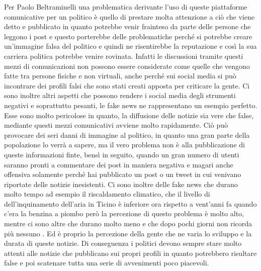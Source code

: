 Per Paolo Beltraminelli una problematica derivante l’uso di queste piattaforme comunicative per un politico è quello di prestare molta attenzione a ciò che viene detto e pubblicato in quanto potrebbe venir frainteso da parte delle persone che leggono i post e questo porterebbe delle problematiche perché si potrebbe creare un’immagine falsa del politico e quindi ne risentirebbe la reputazione e così la sua carriera politica potrebbe venire rovinata. Infatti le discussioni tramite questi mezzi di comunicazioni non possono essere considerate come quelle che vengono fatte tra persone fisiche e non virtuali, anche perché sui social media si può incontrare dei profili falsi che sono stati creati apposta per criticare la gente. Ci sono inoltre altri aspetti che possono rendere i social media degli strumenti negativi e soprattutto pesanti, le fake news ne rappresentano un esempio perfetto. Esse sono molto pericolose in quanto, la diffusione delle notizie sia vere che false, mediante questi mezzi comunicativi avviene molto rapidamente. Ciò può provocare dei seri danni di immagine al politico, in quanto una gran parte della popolazione lo verrà a sapere, ma il vero problema non è alla pubblicazione di queste informazioni finte, bensì in seguito, quando un gran numero di utenti saranno pronti a commentare dei post in maniera negativa e magari anche offensiva solamente perché hai pubblicato un post o un tweet in cui venivano riportate delle notizie inesistenti. Ci sono inoltre delle fake news che durano molto tempo ad esempio il riscaldamento climatico, che il livello di dell’inquinamento dell’aria in Ticino è inferiore ora rispetto a vent’anni fa quando c’era la benzina a piombo però la percezione di questo problema è molto alto, mentre ci sono altre che durano molto meno e che dopo pochi giorni non ricorda più nessuno . Ed è proprio la percezione della gente che ne varia lo sviluppo e la durata di queste notizie. Di conseguenza i politici devono sempre stare molto attenti alle notizie che pubblicano sui propri profili in quanto potrebbero risultare false e poi scatenare tutta una serie di avvenimenti poco piacevoli.  
